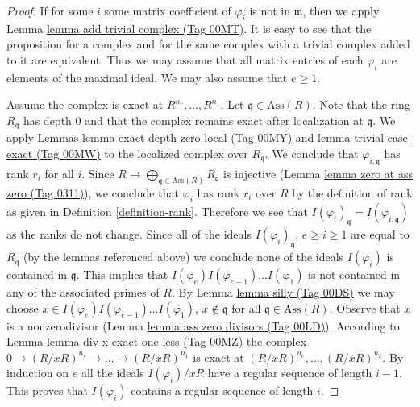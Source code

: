 \documentclass{amsart}
\theoremstyle{plain}
\theoremstyle{definition}
\theoremstyle{remark}
\numberwithin{equation}{subsection}
\begin{document}
\begin{proof}
If for some $i$ some matrix coefficient of $\varphi_i$
is not in $\mathfrak m$, then we apply Lemma \href{https://stacks.math.columbia.edu/tag/00MT}{lemma add trivial complex (Tag 00MT)}.
It is easy to see that the proposition for a complex and
for the same complex with a trivial complex added to it
are equivalent. Thus we may assume that all matrix entries
of each $\varphi_i$ are elements of the maximal ideal.
We may also assume that $e \geq 1$.

\medskip\noindent
Assume the complex is exact at $R^{n_e}, \ldots, R^{n_1}$.
Let $\mathfrak q \in \text{Ass}(R)$.
Note that the ring $R_{\mathfrak q}$ has depth $0$
and that the complex remains exact after localization at $\mathfrak q$.
We apply Lemmas \href{https://stacks.math.columbia.edu/tag/00MY}{lemma exact depth zero local (Tag 00MY)} and
\href{https://stacks.math.columbia.edu/tag/00MW}{lemma trivial case exact (Tag 00MW)} to the localized complex
over $R_{\mathfrak q}$. We conclude that
$\varphi_{i, \mathfrak q}$ has rank $r_i$ for all $i$.
Since $R \to \bigoplus_{\mathfrak q \in \text{Ass}(R)} R_\mathfrak q$
is injective (Lemma \href{https://stacks.math.columbia.edu/tag/0311}{lemma zero at ass zero (Tag 0311)}), we conclude that
$\varphi_i$ has rank $r_i$ over $R$ by the definition of rank as given
in Definition \ref{definition-rank}. Therefore we see that
$I(\varphi_i)_\mathfrak q = I(\varphi_{i, \mathfrak q})$
as the ranks do not change. Since all of the ideals
$I(\varphi_i)_{\mathfrak q}$, $e \geq i \geq 1$
are equal to $R_{\mathfrak q}$ (by the lemmas referenced above)
we conclude none of the ideals $I(\varphi_i)$ is contained in $\mathfrak q$.
This implies that $I(\varphi_e)I(\varphi_{e-1})\ldots I(\varphi_1)$
is not contained in any of the associated primes
of $R$. By Lemma \href{https://stacks.math.columbia.edu/tag/00DS}{lemma silly (Tag 00DS)} we may choose
$x \in I(\varphi_e)I(\varphi_{e - 1})\ldots I(\varphi_1)$,
$x \not \in \mathfrak q$ for all $\mathfrak q \in \text{Ass}(R)$.
Observe that $x$ is a nonzerodivisor (Lemma \href{https://stacks.math.columbia.edu/tag/00LD}{lemma ass zero divisors (Tag 00LD)}).
According to Lemma \href{https://stacks.math.columbia.edu/tag/00MZ}{lemma div x exact one less (Tag 00MZ)}
the complex $0 \to (R/xR)^{n_e} \to \ldots \to (R/xR)^{n_1}$ is exact
at $(R/xR)^{n_e}, \ldots, (R/xR)^{n_2}$. By induction
on $e$ all the ideals $I(\varphi_i)/xR$ have a regular
sequence of length $i - 1$. This proves that $I(\varphi_i)$
contains a regular sequence of length $i$.


\end{proof}
\end{document}
